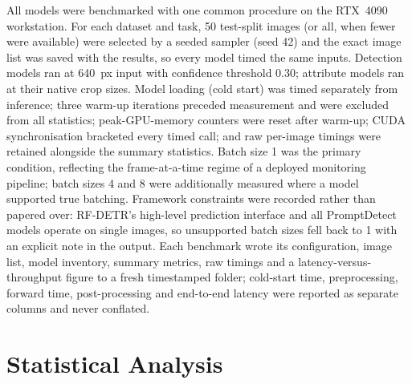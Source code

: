 All models were benchmarked with one common procedure on the RTX~4090 workstation. For each dataset and task, 50 test-split images (or all, when fewer were available) were selected by a seeded sampler (seed 42) and the exact image list was saved with the results, so every model timed the same inputs. Detection models ran at 640~px input with confidence threshold 0.30; attribute models ran at their native crop sizes. Model loading (cold start) was timed separately from inference; three warm-up iterations preceded measurement and were excluded from all statistics; peak-GPU-memory counters were reset after warm-up; CUDA synchronisation bracketed every timed call; and raw per-image timings were retained alongside the summary statistics. Batch size 1 was the primary condition, reflecting the frame-at-a-time regime of a deployed monitoring pipeline; batch sizes 4 and 8 were additionally measured where a model supported true batching. Framework constraints were recorded rather than papered over: RF-DETR's high-level prediction interface and all PromptDetect models operate on single images, so unsupported batch sizes fell back to 1 with an explicit note in the output. Each benchmark wrote its configuration, image list, model inventory, summary metrics, raw timings and a latency-versus-throughput figure to a fresh timestamped folder; cold-start time, preprocessing, forward time, post-processing and end-to-end latency were reported as separate columns and never conflated.

\section{Statistical Analysis}
\label{sec:statistical-analysis}

